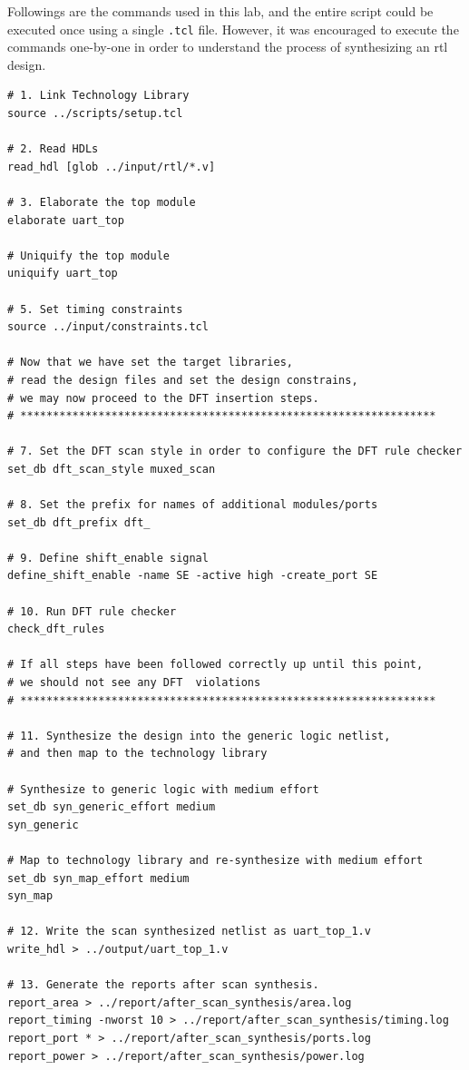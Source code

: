 \documentclass[a4paper,11pt]{article}%
\begin{document}
Followings are the commands used in this lab, and the entire script could be executed once using a single {\tt .tcl} file. However, it was encouraged to execute the commands one-by-one in order to understand the process of synthesizing an \ac{rtl} design.
\vspace{2cm}
\begin{Verbatim}[frame=single]
# 1. Link Technology Library
source ../scripts/setup.tcl

# 2. Read HDLs
read_hdl [glob ../input/rtl/*.v]

# 3. Elaborate the top module
elaborate uart_top

# Uniquify the top module
uniquify uart_top

# 5. Set timing constraints
source ../input/constraints.tcl

# Now that we have set the target libraries, 
# read the design files and set the design constrains,  
# we may now proceed to the DFT insertion steps.
# **************************************************************** 

# 7. Set the DFT scan style in order to configure the DFT rule checker
set_db dft_scan_style muxed_scan

# 8. Set the prefix for names of additional modules/ports
set_db dft_prefix dft_

# 9. Define shift_enable signal
define_shift_enable -name SE -active high -create_port SE

# 10. Run DFT rule checker
check_dft_rules

# If all steps have been followed correctly up until this point, 
# we should not see any DFT  violations
# ****************************************************************

# 11. Synthesize the design into the generic logic netlist,
# and then map to the technology library

# Synthesize to generic logic with medium effort
set_db syn_generic_effort medium
syn_generic

# Map to technology library and re-synthesize with medium effort
set_db syn_map_effort medium
syn_map

# 12. Write the scan synthesized netlist as uart_top_1.v
write_hdl > ../output/uart_top_1.v

# 13. Generate the reports after scan synthesis.
report_area > ../report/after_scan_synthesis/area.log
report_timing -nworst 10 > ../report/after_scan_synthesis/timing.log
report_port * > ../report/after_scan_synthesis/ports.log
report_power > ../report/after_scan_synthesis/power.log


\end{Verbatim}
\end{document}
